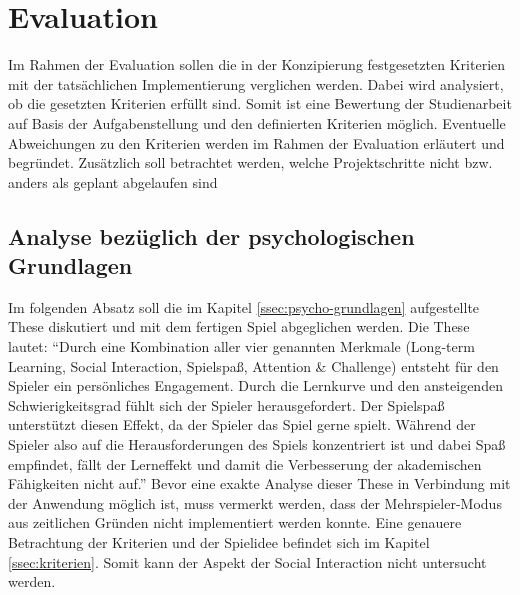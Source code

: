 \section{Evaluation}
    Im Rahmen der Evaluation sollen die in der Konzipierung festgesetzten Kriterien mit der tatsächlichen Implementierung verglichen werden. Dabei wird analysiert, ob die gesetzten Kriterien erfüllt sind. Somit ist eine Bewertung der Studienarbeit auf Basis der Aufgabenstellung und den definierten Kriterien möglich.
    Eventuelle Abweichungen zu den Kriterien werden im Rahmen der Evaluation erläutert und begründet. Zusätzlich soll betrachtet werden, welche Projektschritte nicht bzw. anders als geplant abgelaufen sind

\subsection{Analyse bezüglich der psychologischen Grundlagen}
Im folgenden Absatz soll die im Kapitel \ref{ssec:psycho-grundlagen} aufgestellte These diskutiert und mit dem fertigen Spiel abgeglichen werden. Die These lautet:
\enquote{Durch eine Kombination aller vier genannten Merkmale (Long-term Learning, Social Interaction, Spielspaß, Attention \& Challenge) entsteht für den Spieler ein persönliches Engagement. Durch die Lernkurve und den ansteigenden Schwierigkeitsgrad fühlt sich der Spieler herausgefordert. Der Spielspaß unterstützt diesen Effekt, da der Spieler das Spiel gerne spielt. Während der Spieler also auf die Herausforderungen des Spiels konzentriert ist und dabei Spaß empfindet, fällt der Lerneffekt und damit die Verbesserung der akademischen Fähigkeiten nicht auf.}
Bevor eine exakte Analyse dieser These in Verbindung mit der Anwendung möglich ist, muss vermerkt werden, dass der Mehrspieler-Modus aus zeitlichen Gründen nicht implementiert werden konnte. Eine genauere Betrachtung der Kriterien und der Spielidee befindet sich im Kapitel \ref{ssec:kriterien}. Somit kann der Aspekt der Social Interaction nicht untersucht werden.
